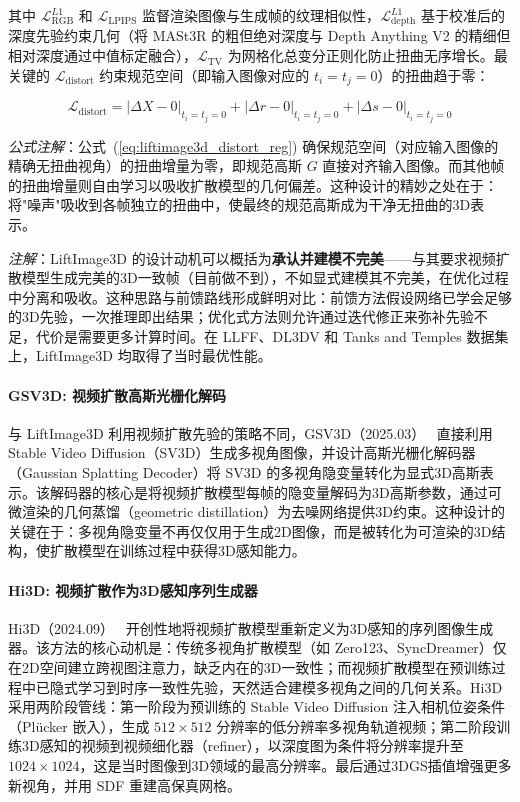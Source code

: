 其中 $\mathcal{L}_{\mathrm{RGB}}^{L1}$ 和 $\mathcal{L}_{\mathrm{LPIPS}}$ 监督渲染图像与生成帧的纹理相似性，$\mathcal{L}_{\mathrm{depth}}^{L1}$ 基于校准后的深度先验约束几何（将 MASt3R 的粗但绝对深度与 Depth Anything V2 的精细但相对深度通过中值标定融合），$\mathcal{L}_{\mathrm{TV}}$ 为网格化总变分正则化防止扭曲无序增长。最关键的 $\mathcal{L}_{\mathrm{distort}}$ 约束规范空间（即输入图像对应的 $t_i = t_j = 0$）的扭曲趋于零：

\begin{equation}
\label{eq:liftimage3d_distort_reg}
\mathcal{L}_{\mathrm{distort}} = |\Delta X - 0|_{t_i=t_j=0} + |\Delta r - 0|_{t_i=t_j=0} + |\Delta s - 0|_{t_i=t_j=0}
\end{equation}

\textit{公式注解}：公式~(\ref{eq:liftimage3d_distort_reg}) 确保规范空间（对应输入图像的精确无扭曲视角）的扭曲增量为零，即规范高斯 $G$ 直接对齐输入图像。而其他帧的扭曲增量则自由学习以吸收扩散模型的几何偏差。这种设计的精妙之处在于：将"噪声"吸收到各帧独立的扭曲中，使最终的规范高斯成为干净无扭曲的3D表示。

\textit{注解}：LiftImage3D 的设计动机可以概括为\textbf{承认并建模不完美}——与其要求视频扩散模型生成完美的3D一致帧（目前做不到），不如显式建模其不完美，在优化过程中分离和吸收。这种思路与前馈路线形成鲜明对比：前馈方法假设网络已学会足够的3D先验，一次推理即出结果；优化式方法则允许通过迭代修正来弥补先验不足，代价是需要更多计算时间。在 LLFF、DL3DV 和 Tanks and Temples 数据集上，LiftImage3D 均取得了当时最优性能。

\paragraph{GSV3D: 视频扩散高斯光栅化解码}

与 LiftImage3D 利用视频扩散先验的策略不同，GSV3D（2025.03）~\cite{2503_06136} 直接利用 Stable Video Diffusion（SV3D）生成多视角图像，并设计高斯光栅化解码器（Gaussian Splatting Decoder）将 SV3D 的多视角隐变量转化为显式3D高斯表示。该解码器的核心是将视频扩散模型每帧的隐变量解码为3D高斯参数，通过可微渲染的几何蒸馏（geometric distillation）为去噪网络提供3D约束。这种设计的关键在于：多视角隐变量不再仅仅用于生成2D图像，而是被转化为可渲染的3D结构，使扩散模型在训练过程中获得3D感知能力。

\paragraph{Hi3D: 视频扩散作为3D感知序列生成器}

Hi3D（2024.09）~\cite{2409_07452} 开创性地将视频扩散模型重新定义为3D感知的序列图像生成器。该方法的核心动机是：传统多视角扩散模型（如 Zero123、SyncDreamer）仅在2D空间建立跨视图注意力，缺乏内在的3D一致性；而视频扩散模型在预训练过程中已隐式学习到时序一致性先验，天然适合建模多视角之间的几何关系。Hi3D 采用两阶段管线：第一阶段为预训练的 Stable Video Diffusion 注入相机位姿条件（Pl\"{u}cker 嵌入），生成 $512 \times 512$ 分辨率的低分辨率多视角轨道视频；第二阶段训练3D感知的视频到视频细化器（refiner），以深度图为条件将分辨率提升至 $1024 \times 1024$，这是当时图像到3D领域的最高分辨率。最后通过3DGS插值增强更多新视角，并用 SDF 重建高保真网格。

